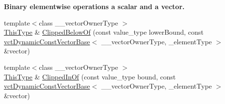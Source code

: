 \begin{Indent}{\bf Binary elementwise operations a scalar and a vector.}
\begin{DoxyCompactItemize}
\item 
{\footnotesize template$<$class \-\_\-\-\_\-vector\-Owner\-Type $>$ }\\\hyperlink{classvct_dynamic_const_vector_base_a39da273523717f678f54d3321ebca3dd}{This\-Type} \& \hyperlink{classvct_dynamic_vector_base_a05e54537bddcec043c39976525b0bcd7}{Clipped\-Below\-Of} (const value\-\_\-type lower\-Bound, const \hyperlink{classvct_dynamic_const_vector_base}{vct\-Dynamic\-Const\-Vector\-Base}$<$ \-\_\-\-\_\-vector\-Owner\-Type, \-\_\-element\-Type $>$ \&vector)
\item 
{\footnotesize template$<$class \-\_\-\-\_\-vector\-Owner\-Type $>$ }\\\hyperlink{classvct_dynamic_const_vector_base_a39da273523717f678f54d3321ebca3dd}{This\-Type} \& \hyperlink{classvct_dynamic_vector_base_a26861762ef763c10ffcd9bc02530d291}{Clipped\-In\-Of} (const value\-\_\-type bound, const \hyperlink{classvct_dynamic_const_vector_base}{vct\-Dynamic\-Const\-Vector\-Base}$<$ \-\_\-\-\_\-vector\-Owner\-Type, \-\_\-element\-Type $>$ \&vector)
\end{DoxyCompactItemize}
\end{Indent}
